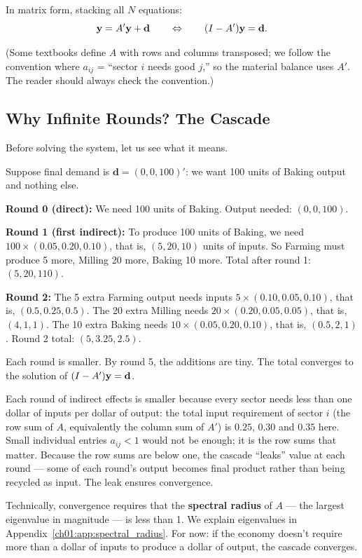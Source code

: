 \documentclass[../structural_economics_book.tex]{subfiles}
\begin{document}
In matrix form, stacking all $N$ equations:
\begin{equation}\label{ch01:eq:leontief}
\mathbf{y} = A'\mathbf{y} + \mathbf{d} \qquad \Leftrightarrow \qquad (I - A')\mathbf{y} = \mathbf{d}.
\end{equation}

(Some textbooks define $A$ with rows and columns transposed; we follow the convention where $a_{ij}$ = ``sector $i$ needs good $j$,'' so the material balance uses $A'$. The reader should always check the convention.)

\subsection{Why Infinite Rounds? The Cascade}

Before solving the system, let us see what it means.

\begin{example}\label{ch01:ex:cascade}
Suppose final demand is $\mathbf{d} = (0, 0, 100)'$: we want 100 units of Baking output and nothing else.

\textbf{Round 0 (direct):} We need 100 units of Baking. Output needed: $(0, 0, 100)$.

\begin{sloppypar}\textbf{Round 1 (first indirect):} To produce 100 units of Baking, we need $100 \times (0.05, 0.20, 0.10)$, that is, $(5, 20, 10)$ units of inputs. So Farming must produce 5 more, Milling 20 more, Baking 10 more. Total after round 1: $(5, 20, 110)$.\end{sloppypar}

\textbf{Round 2:} The 5 extra Farming output needs inputs $5 \times (0.10, 0.05, 0.10)$, that is, $(0.5, 0.25, 0.5)$. The 20 extra Milling needs $20 \times (0.20, 0.05, 0.05)$, that is, $(4, 1, 1)$. The 10 extra Baking needs $10 \times (0.05, 0.20, 0.10)$, that is, $(0.5, 2, 1)$. Round 2 total: $(5, 3.25, 2.5)$.

Each round is smaller. By round 5, the additions are tiny. The total converges to the solution of $(I - A')\mathbf{y} = \mathbf{d}$.
\end{example}

\begin{intuition}
Each round of indirect effects is smaller because every sector needs less than one dollar of inputs per dollar of output: the total input requirement of sector $i$ (the row sum of $A$, equivalently the column sum of $A'$) is $0.25$, $0.30$ and $0.35$ here. Small individual entries $a_{ij} < 1$ would not be enough; it is the row sums that matter. Because the row sums are below one, the cascade ``leaks'' value at each round --- some of each round's output becomes final product rather than being recycled as input. The leak ensures convergence.

Technically, convergence requires that the \textbf{spectral radius} of $A$ --- the largest eigenvalue in magnitude --- is less than 1. We explain eigenvalues in Appendix~\ref{ch01:app:spectral_radius}. For now: if the economy doesn't require more than a dollar of inputs to produce a dollar of output, the cascade converges.
\end{intuition}
\end{document}
